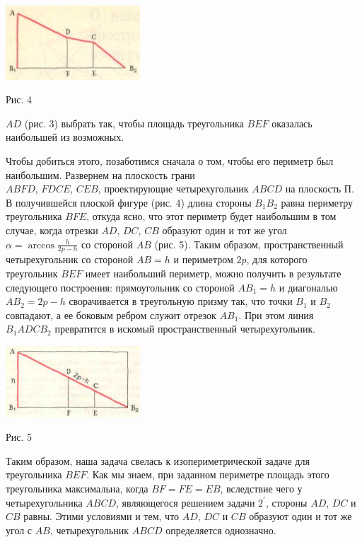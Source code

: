 \twocolumn
\begin{center}
\includegraphics[width=190px]{pic1.png}
\end{center}

\noindent Рис. 4
\newline


\par \noindent $AD$ (рис. 3) выбрать так, чтобы площадь треугольника $BEF$ оказалась наибольшей из возможных.


\par Чтобы добиться этого, позаботимся сначала о том, чтобы его периметр был наибольшим. Развернем на плоскость грани\\ $ABFD$, $FDCE$, $CEB$, проектирующие четырехугольник $ABCD$ на плоскость П. В получившейся плоской фигуре (рис. 4) длина стороны $B_{1}B_{2}$ равна периметру треугольника $BFE$, откуда ясно, что этот периметр будет наибольшим в том случае, когда отрезки $AD$, $DC$, $CB$ образуют один и тот же угол $\alpha = \arccos{\frac{h}{2p-h}}$ со стороной $AB$ (рис. 5). Таким образом, пространственный четырехугольник со стороной $AB = h$ и периметром $2p$, для которого треугольник $BEF$ имеет наибольший периметр, можно получить в результате следующего построения: прямоугольник со стороной $AB_{1} = h$ и диагональю $AB_{2} = 2p - h$ сворачивается в треугольную призму так, что точки $B_{1}$ и $B_{2}$ совпадают, а ее боковым ребром служит отрезок $AB_{1}$. При этом линия $B_{1}ADCB_{2}$ превратится в искомый пространственный четырехугольник.


\begin{center}
\includegraphics[width=190px]{pic2.png}
\end{center}
\noindent Рис. 5
\pagebreak

\par Таким образом, наша задача свелась к изопериметрической задаче для треугольника $BEF$. Как мы знаем, при заданном периметре  площадь этого треугольника максимальна, когда $BF = FE = EB$, вследствие чего у четырехугольника $ABCD$, являющегося решением задачи $2^\prime$, стороны $AD$, $DC$ и $CB$ равны. Этими условиями и тем, что $AD$, $DC$ и $CB$ образуют один и тот же угол с $AB$, четырехугольник $ABCD$ определяется однозначно.

